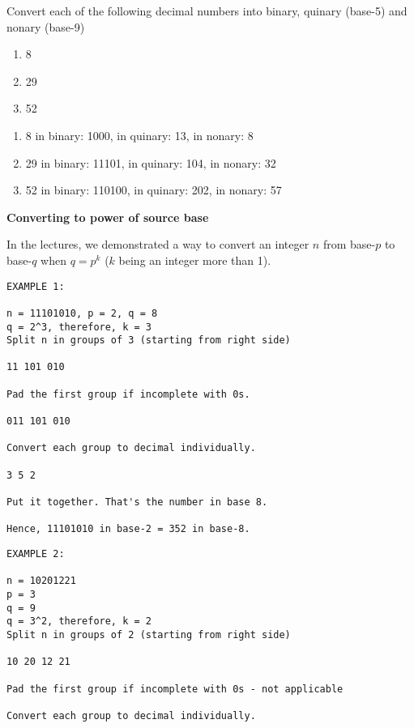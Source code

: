 \begin{questions}
Convert each of the following decimal numbers into binary, quinary (base-5) and nonary (base-9)

\begin{enumerate}
\item 8	
\item 29
\item 52
\end{enumerate}

\begin{solution}
	
\begin{enumerate}
\item 8	in binary: 1000, in quinary: 13, in nonary: 8 
\item 29 in binary: 11101, in quinary: 104, in nonary: 32 
\item 52 in binary: 110100, in quinary: 202, in nonary: 57 
\end{enumerate}
\end{solution}

\question \textbf{Converting to power of source base}

In the lectures, we demonstrated a way to convert an integer $n$ from base-$p$ to base-$q$ when $q = p^k$ ($k$ being an integer more than 1).

\begin{verbatim}
EXAMPLE 1:

n = 11101010, p = 2, q = 8 
q = 2^3, therefore, k = 3
Split n in groups of 3 (starting from right side)

11 101 010

Pad the first group if incomplete with 0s.

011 101 010

Convert each group to decimal individually.

3 5 2

Put it together. That's the number in base 8.

Hence, 11101010 in base-2 = 352 in base-8.
\end{verbatim}

\newpage

\begin{verbatim}
EXAMPLE 2:

n = 10201221
p = 3
q = 9
q = 3^2, therefore, k = 2
Split n in groups of 2 (starting from right side)

10 20 12 21

Pad the first group if incomplete with 0s - not applicable

Convert each group to decimal individually.


\end{verbatim}
\end{questions}
